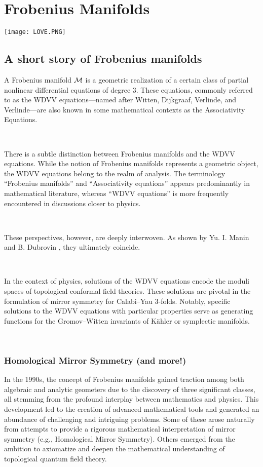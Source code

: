 
%
%

\chapter{Frobenius Manifolds}
\begin{center}
\texttt{[image: LOVE.PNG]}
  \end{center}

\section{A short story of Frobenius manifolds}


A Frobenius manifold $\mathcal{M}$ is a geometric realization of a certain class of partial nonlinear differential equations of degree $3$. These equations, commonly referred to as the WDVV equations—named after Witten, Dijkgraaf, Verlinde, and Verlinde—are also known in some mathematical contexts as the Associativity Equations.

\,

There is a subtle distinction between Frobenius manifolds and the WDVV equations. While the notion of Frobenius manifolds represents a geometric object, the WDVV equations belong to the realm of analysis. The terminology “Frobenius manifolds” and “Associativity equations” appears predominantly in mathematical literature, whereas “WDVV equations” is more frequently encountered in discussions closer to physics.

\,

These perspectives, however, are deeply interwoven. As shown by Yu. I. Manin \cite{Man99} and B. Dubrovin \cite{Du}, they ultimately coincide.

\,

In the context of physics, solutions of the WDVV equations encode the moduli spaces of topological conformal field theories. These solutions are pivotal in the formulation of mirror symmetry for Calabi--Yau $3$-folds. Notably, specific solutions to the WDVV equations with particular properties serve as generating functions for the Gromov--Witten invariants of Kähler or symplectic manifolds.

\,
\subsection{Homological Mirror Symmetry (and more!)}
In the 1990s, the concept of Frobenius manifolds gained traction among both algebraic and analytic geometers due to the discovery of three significant classes, all stemming from the profound interplay between mathematics and physics. This development led to the creation of advanced mathematical tools and generated an abundance of challenging and intriguing problems. Some of these arose naturally from attempts to provide a rigorous mathematical interpretation of mirror symmetry (e.g., Homological Mirror Symmetry). Others emerged from the ambition to axiomatize and deepen the mathematical understanding of topological quantum field theory.

